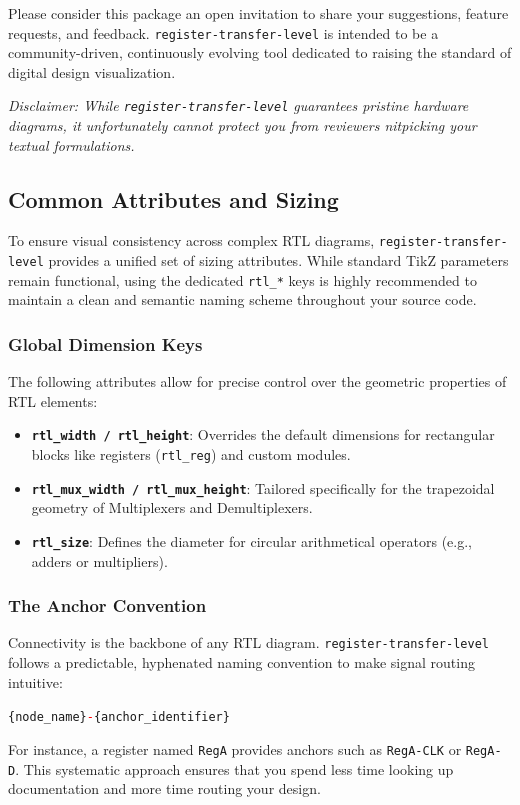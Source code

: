 Please consider this package an open invitation to share your suggestions, feature requests, and feedback. \texttt{register-transfer-level} is intended to be a community-driven, continuously evolving tool dedicated to raising the standard of digital design visualization.

\textit{Disclaimer: While \texttt{register-transfer-level} guarantees pristine hardware diagrams, it unfortunately cannot protect you from reviewers nitpicking your textual formulations.}

\subsection{Common Attributes and Sizing}

To ensure visual consistency across complex RTL diagrams, \texttt{register-transfer-level} provides a unified set of sizing attributes. While standard TikZ parameters remain functional, using the dedicated \texttt{rtl\_*} keys is highly recommended to maintain a clean and semantic naming scheme throughout your source code.

\subsubsection{Global Dimension Keys}
The following attributes allow for precise control over the geometric properties of RTL elements:

\begin{itemize}
	\item \textbf{\texttt{rtl\_width / rtl\_height}}: Overrides the default dimensions for rectangular blocks like registers (\texttt{rtl\_reg}) and custom modules.
	\item \textbf{\texttt{rtl\_mux\_width / rtl\_mux\_height}}: Tailored specifically for the trapezoidal geometry of Multiplexers and Demultiplexers.
	\item \textbf{\texttt{rtl\_size}}: Defines the diameter for circular arithmetical operators (e.g., adders or multipliers).
\end{itemize}

\subsubsection{The Anchor Convention}
Connectivity is the backbone of any RTL diagram. \texttt{register-transfer-level} follows a predictable, hyphenated naming convention to make signal routing intuitive:

\begin{center}
	\texttt{\{node\_name\}\textcolor{red}{-}\{anchor\_identifier\}}
\end{center}

For instance, a register named \texttt{RegA} provides anchors such as \texttt{RegA-CLK} or \texttt{RegA-D}. This systematic approach ensures that you spend less time looking up documentation and more time routing your design.

